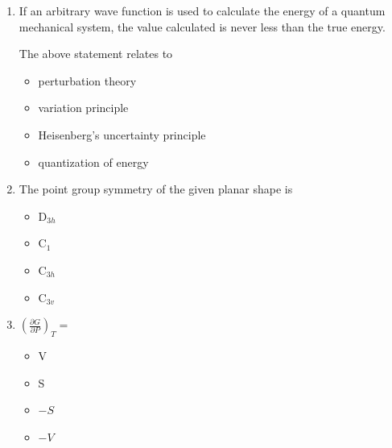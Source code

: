 \documentclass[journal,12pt,onecolumn]{IEEEtran}
\theoremstyle{remark}
\begin{document}
\begin{enumerate}
\item    \hspace{0.5 cm} If an arbitrary wave function is used to calculate the energy of a quantum mechanical system, the value calculated is never less than the true energy.

The above statement relates to  \hfill{}

\begin{multicols}{2}
\begin{itemize}[label=(A)]
    \item perturbation theory
    \item variation principle
    \item Heisenberg's uncertainty principle
    \item quantization of energy
\end{itemize}
\end{multicols}
 

\item    \hspace{0.5 cm} The point group symmetry of the given planar shape is  \hfill{}

\begin{center}
\end{center}

\begin{multicols}{2}
\begin{itemize}[label=(A)]
    \item D$_{3h}$
    \item C$_1$
    \item C$_{3h}$
    \item C$_{3v}$
\end{itemize}
\end{multicols} 
 

\item    \hspace{0.5cm} \( \left( \frac{\partial G}{\partial P} \right)_T = \)  \hfill{}

\begin{multicols}{2}
\begin{itemize}[label=(A)]
    \item V
    \item S
    \item $-S$
    \item $-V$
\end{itemize}
\end{multicols}
 



\end{enumerate}
\end{document}
